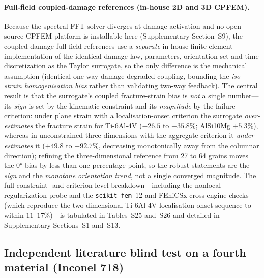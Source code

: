 \paragraph{Full-field coupled-damage references (in-house 2D and 3D CPFEM).} Because the spectral-FFT solver diverges at damage activation and no open-source CPFEM platform is installable here (Supplementary Section~S9), the coupled-damage full-field references use a \emph{separate} in-house finite-element implementation of the identical damage law, parameters, orientation set and time discretization as the Taylor surrogate, so the only difference is the mechanical assumption (identical one-way damage-degraded coupling, bounding the \emph{iso-strain homogenisation bias} rather than validating two-way feedback). The central result is that the surrogate's coupled fracture-strain bias is \emph{not} a single number---its \emph{sign} is set by the kinematic constraint and its \emph{magnitude} by the failure criterion: under plane strain with a localisation-onset criterion the surrogate \emph{over-estimates} the fracture strain for Ti-6Al-4V ($-26.5$ to $-35.8\%$; AlSi10Mg $+5.3\%$), whereas in unconstrained three dimensions with the aggregate criterion it \emph{under-estimates} it ($+49.8$ to $+92.7\%$, decreasing monotonically away from the columnar direction); refining the three-dimensional reference from 27 to 64 grains moves the $\ang{0}$ bias by less than one percentage point, so the robust statements are the \emph{sign} and the \emph{monotone orientation trend}, not a single converged magnitude. The full constraint- and criterion-level breakdown---including the nonlocal regularization probe and the \texttt{scikit-fem}~12 and FEniCSx cross-engine checks (which reproduce the two-dimensional Ti-6Al-4V localisation-onset sequence to within $11$--$17\%$)---is tabulated in Tables~S25 and~S26 and detailed in Supplementary Sections~S1 and~S13.

\subsection{Independent literature blind test on a fourth material (Inconel 718)}
\label{sec:in718_blind}

